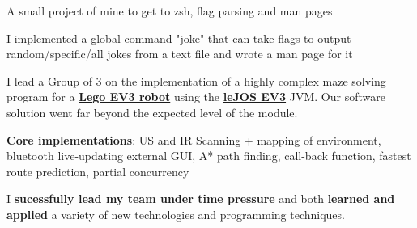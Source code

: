 \documentclass[]{jonas-cv}
\begin{document}
\begin{minipage}[t]{0.63\textwidth}
\begin{tightemize}
    \item A small project of mine to get to zsh, flag parsing and man pages 
    \item I implemented a global command "joke" that can take flags to output random/specific/all jokes from a text file and wrote a man page for it
\end{tightemize}
\largesectionsep

\begin{tightemize}
   \item I lead a Group of 3 on the implementation of a highly complex maze solving program for a \href{https://education.lego.com/en-gb/product/mindstorms-ev3}{\textbf{Lego EV3 robot}} using the \href{http://www.lejos.org/}{\textbf{leJOS EV3}} JVM. 
   Our software solution went far beyond the expected level of the module.
   \item \textbf{Core implementations}: US and IR Scanning + mapping of environment, bluetooth live-updating external GUI, A* path finding, 
   call-back function, fastest route prediction, partial concurrency
   \item[\faicon{angle-double-right}] I \textbf{sucessfully lead my team under time pressure} and both \textbf{learned and applied} a variety of new technologies and programming techniques.
\end{tightemize}

\end{minipage}
\end{document}
